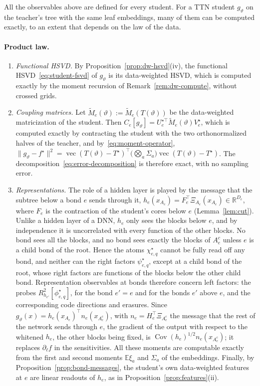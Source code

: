 \documentclass[11pt]{article}
\newcommand{\R}{\mathbb{R}}
\newcommand{\E}{\mathbb{E}}
\newcommand{\vect}{\operatorname{vec}}
\newcommand{\norm}[1]{\lVert #1\rVert}
\newcommand{\Cov}{\operatorname{Cov}}
\theoremstyle{definition}
\numberwithin{equation}{section}
\begin{document}
All the observables above are defined for every student. For a TTN student $g_\vartheta$ on the teacher's tree with the same leaf embeddings, many of them can be computed exactly, to an extent that depends on the law of the data.

\paragraph{Product law.}
\begin{enumerate}[label=(\roman*),nosep]
\item \emph{Functional HSVD.} By Proposition~\ref{prop:dw-hsvd}(iv), the functional HSVD~\eqref{eq:student-fsvd} of $g_\vartheta$ is its data-weighted HSVD, which is computed exactly by the moment recursion of Remark~\ref{rem:dw-compute}, without crossed grids.
\item \emph{Coupling matrices.} Let $\tilde M_e(\vartheta):=\tilde M_e(T(\vartheta))$ be the data-weighted matricization of the student. Then $C_e[g_\vartheta]=U^{\star\top}_e\tilde M_e(\vartheta)V^\star_e$, which is computed exactly by contracting the student with the two orthonormalized halves of the teacher, and by~\eqref{eq:moment-operator}, $\norm{g_\vartheta-f^\star}^2=\vect(T(\vartheta)-T^\star)^\top\big(\bigotimes_a\Sigma_a\big)\vect(T(\vartheta)-T^\star)$. The decomposition~\eqref{eq:error-decomposition} is therefore exact, with no sampling error.
\item \emph{Representations.} The role of a hidden layer is played by the message that the subtree below a bond $e$ sends through it, $h_e(x_{A_e})=F_e^\top\Xi_{A_e}(x_{A_e})\in\R^{D_e}$, where $F_e$ is the contraction of the student's cores below $e$ (Lemma~\ref{lem:cut}). Unlike a hidden layer of a DNN, $h_e$ only sees the blocks below $e$, and by independence it is uncorrelated with every function of the other blocks. No bond sees all the blocks, and no bond sees exactly the blocks of $A_e^c$ unless $e$ is a child bond of the root. Hence the atoms $\chi^\star_{e,q}$ cannot be fully read off any bond, and neither can the right factors $\psi^\star_{e,q}$, except at a child bond of the root, whose right factors are functions of the blocks below the other child bond. Representation observables at bonds therefore concern left factors: the probes $R^2_{h_{e'}}[\phi^\star_{e,q}]$, for the bond $e'=e$ and for the bonds $e'$ above $e$, and the corresponding code directions and erasures. Since $g_\vartheta(x)=h_e(x_{A_e})^\top n_e(x_{A_e^c})$, with $n_e=H_e^\top\Xi_{A_e^c}$ the message that the rest of the network sends through $e$, the gradient of the output with respect to the whitened $h_e$, the other blocks being fixed, is $\Cov(h_e)^{1/2}n_e(x_{A_e^c})$; it replaces $\partial_\ell f$ in the sensitivities. All these moments are computable exactly from the first and second moments $\E\xi_a$ and $\Sigma_a$ of the embeddings. Finally, by Proposition~\ref{prop:bond-messages}, the student's own data-weighted features at $e$ are linear readouts of $h_e$, as in Proposition~\ref{prop:features}(ii).
\end{enumerate}
\end{document}
